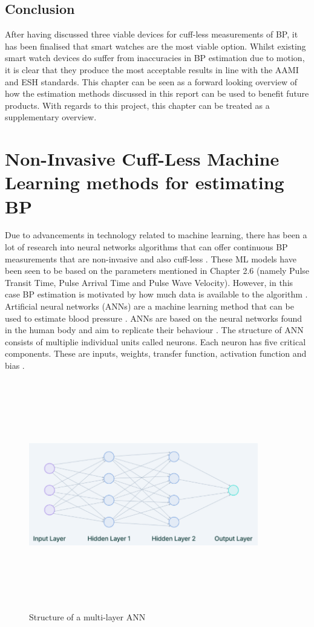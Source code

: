 \documentclass[11pt, a4paper]{article}
\begin{document}
\subsection{Conclusion}
After having discussed three viable devices for cuff-less measurements of BP, it has been finalised that smart watches are the most viable option. Whilst existing smart watch devices do suffer from inaccuracies in BP estimation due to motion, it is clear that they produce the most acceptable results in line with the AAMI and ESH standards. This chapter can be seen as a forward looking overview of how the estimation methods discussed in this report can be used to benefit future products. With regards to this project, this chapter can be treated as a supplementary overview.
\newpage
\section{Non-Invasive Cuff-Less Machine Learning methods for estimating BP}
Due to advancements in technology related to machine learning, there has been a lot of research into neural networks algorithms that can offer continuous BP measurements that are non-invasive and also cuff-less \cite{Pradenas2020}. These ML models have been seen to be based on the parameters mentioned in Chapter 2.6 (namely Pulse Transit Time, Pulse Arrival Time and Pulse Wave Velocity). However, in this case BP estimation is motivated by how much data is available to the algorithm \cite{ElHajj2020}. \\ \newline \noindent Artificial neural networks (ANNs) are a machine learning method that can be used to estimate blood pressure \cite{Pradenas2020}. ANNs are based on the neural networks found in the human body and aim to replicate their behaviour \cite{Yang2020}. The structure of ANN consists of multiplie individual units called neurons. Each neuron has five critical components. These are inputs, weights, transfer function, activation function and bias \cite{deeplearning}.  \begin{figure}[H]
    \centering
    \includegraphics[width=10cm,height=10cm,keepaspectratio]{Figures/ann.png}
    \caption{Structure of a multi-layer ANN}
    \label{ann}
\end{figure}
\end{document}
